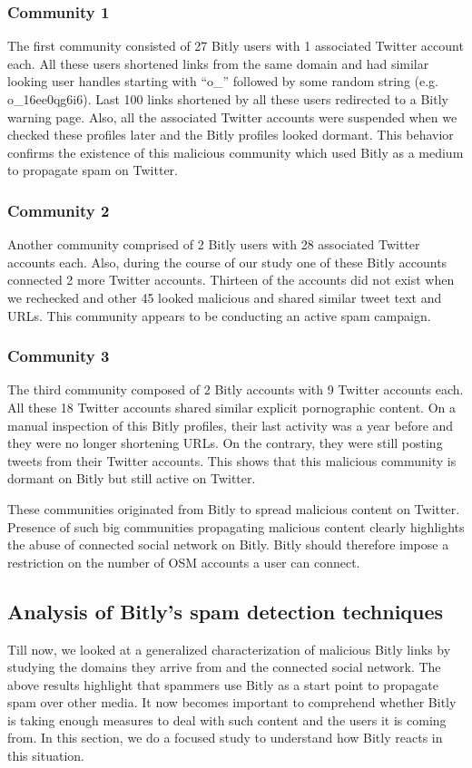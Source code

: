 \documentclass[conference]{IEEEtran}
\begin{document}
\subsubsection{Community 1}The first community consisted of 27 Bitly users with 1 associated Twitter account each. All these users shortened links from the same domain and had similar looking user handles starting with ``o\_'' followed by some random string (e.g. o\_16ee0qg6i6). Last 100 links shortened by all these users redirected to a Bitly warning page. Also, all the associated Twitter accounts were suspended when we checked these profiles later and the Bitly profiles looked dormant. This behavior confirms the existence of this malicious community which used Bitly as a medium to propagate spam on Twitter. 
\subsubsection{Community 2}Another community comprised of 2 Bitly users with 28 associated Twitter accounts each. Also, during the course of our study one of these Bitly accounts connected 2 more Twitter accounts. Thirteen of the accounts did not exist when we rechecked and other 45 looked malicious and shared similar tweet text and URLs. This community appears to be conducting an active spam campaign. 
\subsubsection{Community 3}The third community composed of 2 Bitly accounts with 9 Twitter accounts each. All these 18 Twitter accounts shared similar explicit pornographic content. On a manual inspection of this Bitly profiles, their last activity was a year before and they were no longer shortening URLs. On the contrary, they were still posting tweets from their Twitter accounts. This shows that this malicious community is dormant on Bitly but still active on Twitter. 


These communities originated from Bitly to spread malicious content on Twitter. Presence of such big communities propagating malicious content clearly highlights the abuse of connected social network on Bitly. Bitly should therefore impose a restriction on the number of OSM accounts a user can connect.
\subsection{Analysis of Bitly's spam detection techniques}
\vspace{4pt}
Till now, we looked at a generalized characterization of malicious Bitly links by studying the domains they arrive from and the connected social network. The above results highlight that spammers use Bitly as a start point to propagate spam over other media. It now becomes important to comprehend whether Bitly is taking enough measures to deal with such content and the users it is coming from. In this section, we do a focused study to understand how Bitly reacts in this situation.
\end{document}

